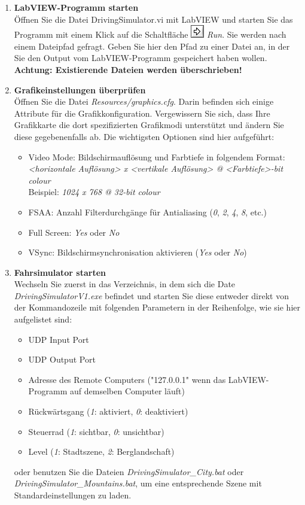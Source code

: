 \begin{enumerate}[label=\arabic*.]

\item \textbf{LabVIEW-Programm starten}\\
Öffnen Sie die Datei DrivingSimulator.vi mit LabVIEW und starten Sie das Programm mit einem Klick auf die Schaltfläche \includegraphics[height=\ht\strutbox]{src/icon_labview_run.png} \textit{Run}. Sie werden nach einem Dateipfad gefragt. Geben Sie hier den Pfad zu einer Datei an, in der Sie den Output vom LabVIEW-Programm gespeichert haben wollen. \textbf{Achtung: Existierende Dateien werden überschrieben!}

\item \textbf{Grafikeinstellungen überprüfen}\\
Öffnen Sie die Datei \textit{Resources/graphics.cfg}. Darin befinden sich einige Attribute für die Grafikkonfiguration. Vergewissern Sie sich, dass Ihre Grafikkarte die dort spezifizierten Grafikmodi unterstützt und ändern Sie diese gegebenenfalls ab. Die wichtigsten Optionen sind hier aufgeführt:
\begin{itemize}
	\item Video Mode: Bildschirmauflösung und Farbtiefe in folgendem Format: \textit{<horizontale Auflösung> x <vertikale Auflösung> @ <Farbtiefe>-bit colour}\\Beispiel: \textit{1024 x 768 @ 32-bit colour}
	\item FSAA: Anzahl Filterdurchgänge für Antialiasing (\textit{0}, \textit{2}, \textit{4}, \textit{8}, etc.)
	\item Full Screen: \textit{Yes} oder \textit{No}
	\item VSync: Bildschirmsynchronisation aktivieren (\textit{Yes} oder \textit{No})
\end{itemize}

\item \textbf{Fahrsimulator starten}\\
Wechseln Sie zuerst in das Verzeichnis, in dem sich die Date \textit{DrivingSimulatorV1.exe} befindet und starten Sie diese entweder direkt von der Kommandozeile mit folgenden Parametern in der Reihenfolge, wie sie hier aufgelistet sind:
\begin{itemize}
	\item UDP Input Port
	\item UDP Output Port
	\item Adresse des Remote Computers ("127.0.0.1" wenn das LabVIEW-Programm auf demselben Computer läuft)
	\item Rückwärtsgang (\textit{1}: aktiviert, \textit{0}: deaktiviert) 
	\item Steuerrad (\textit{1}: sichtbar, \textit{0}: unsichtbar)
	\item Level (\textit{1}: Stadtszene, \textit{2}: Berglandschaft)
\end{itemize}
oder benutzen Sie die Dateien \textit{DrivingSimulator\_City.bat} oder \textit{DrivingSimulator\_Mountains.bat}, um eine entsprechende Szene mit Standardeinstellungen zu laden.


\end{enumerate}
